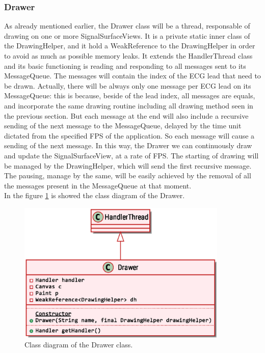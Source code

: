 \subsubsection{Drawer}
As already mentioned earlier, the Drawer class will be a thread, responsable of drawing on one or more SignalSurfaceViews. It is a private static inner class of the DrawingHelper, and it hold a WeakReference to the DrawingHelper in order to avoid as much as possible memory leaks.\cite{ref26} It extends the HandlerThread class and its basic functioning is reading and responding to all messages sent to its MessageQueue. The messages will contain the index of the ECG lead that need to be drawn. Actually, there will be always only one message per ECG lead on its MessageQueue: this is because, beside of the lead index, all messages are equals, and incorporate the same drawing routine including all drawing method seen in the previous section. But each message at the end will also include a recursive sending of the next message to the MessageQueue, delayed by the time unit dictated from the specified FPS of the application. So each message will cause a sending of the next message. In this way, the Drawer we can continuously draw and update the SignalSurfaceView, at a rate of FPS. The starting of drawing will be managed by the DrawingHelper, which will send the first recursive message. The pausing, manage by the same, will be easily achieved by the removal of all the messages present in the MessageQueue at that moment.\\
In the figure \ref{fig9.11} is showed the class diagram of the Drawer.
\begin{figure}[ht!]
	\centering
	\includegraphics[width=100mm]{figures/ch9/11.eps}
	\caption{Class diagram of the Drawer class.}
	\label{fig9.11}
\end{figure}

